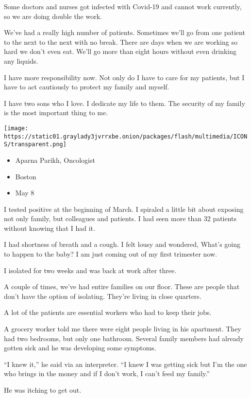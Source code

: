 Some doctors and nurses got infected with Covid-19 and cannot work
currently, so we are doing double the work.

We've had a really high number of patients. Sometimes we'll go from one
patient to the next to the next with no break. There are days when we
are working so hard we don't even eat. We'll go more than eight hours
without even drinking any liquids.

I have more responsibility now. Not only do I have to care for my
patients, but I have to act cautiously to protect my family and myself.

I have two sons who I love. I dedicate my life to them. The security of
my family is the most important thing to me.

\texttt{[image: https://static01.graylady3jvrrxbe.onion/packages/flash/multimedia/ICONS/transparent.png]}

\begin{itemize}
\tightlist
\item
  Aparna Parikh, Oncologist
\item
  Boston
\item
  May 8
\end{itemize}

I tested positive at the beginning of March. I spiraled a little bit
about exposing not only family, but colleagues and patients. I had seen
more than 32 patients without knowing that I had it.

I had shortness of breath and a cough. I felt lousy and wondered, What's
going to happen to the baby? I am just coming out of my first trimester
now.

I isolated for two weeks and was back at work after three.

A couple of times, we've had entire families on our floor. These are
people that don't have the option of isolating. They're living in close
quarters.

A lot of the patients are essential workers who had to keep their jobs.

A grocery worker told me there were eight people living in his
apartment. They had two bedrooms, but only one bathroom. Several family
members had already gotten sick and he was developing some symptoms.

``I knew it,'' he said via an interpreter. ``I knew I was getting sick
but I'm the one who brings in the money and if I don't work, I can't
feed my family.''

He was itching to get out.


